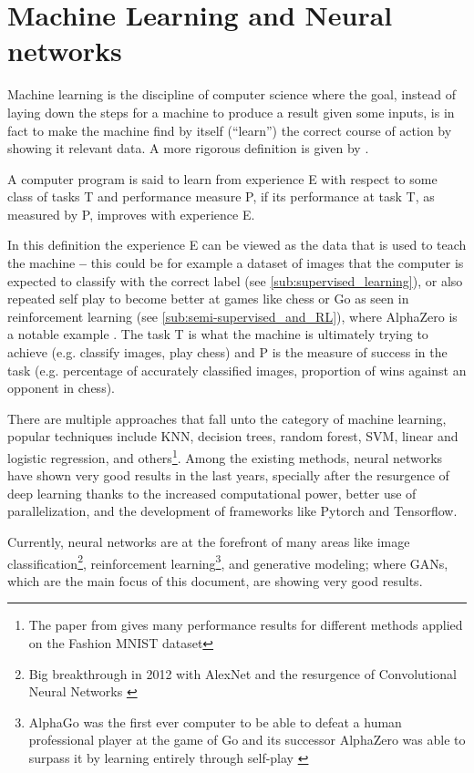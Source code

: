 
\chapter{Machine Learning and Neural networks} \label{cha:neuralNets}

Machine learning is the discipline of computer science where the goal, instead of laying down the steps for a machine to produce a result given some inputs, is in fact to make the machine find by itself (``learn'') the correct course of action by showing it relevant data. A more rigorous definition is given by \textcite{machineLearning1997}.
\begin{citacao}
    A computer program is said to learn from experience E with respect to some class of tasks T and performance measure P, if its performance at task T, as measured by P, improves with experience E. \cite[p. 2]{machineLearning1997}
\end{citacao}

In this definition the experience E can be viewed as the data that is used to teach the machine \textbf{--} this could be for example a dataset of images that the computer is expected to classify with the correct label (see \autoref{sub:supervised_learning}), or also repeated self play to become better at games like chess or Go as seen in reinforcement learning (see \autoref{sub:semi-supervised_and_RL}), where AlphaZero is a notable example \cite{alphaZero2017}.
The task T is what the machine is ultimately trying to achieve (e.g. classify images, play chess) and P is the measure of success in the task (e.g. percentage of accurately classified images, proportion of wins against an opponent in chess).

There are multiple approaches that fall unto the category of machine learning, popular techniques include \gls{KNN}, decision trees, random forest, \gls{SVM}, linear and logistic regression, and others\footnote{
    The paper from \textcite{fashionMNIST2017} gives many performance results for different methods applied on the Fashion MNIST dataset
}. Among the existing methods, neural networks have shown very good results in the last years, specially after the resurgence of deep learning thanks to the increased computational power, better use of parallelization, and the development of frameworks like Pytorch and Tensorflow.

Currently, neural networks are at the forefront of many areas like image classification\footnote{
    Big breakthrough in 2012 with AlexNet and the resurgence of Convolutional Neural Networks \cite{alexnet2012}
}, reinforcement learning\footnote{
    AlphaGo was the first ever computer to be able to defeat a human professional player at the game of Go \cite{alphaGo2016} and its successor AlphaZero was able to surpass it by learning entirely through self-play \cite{alphaZero2017}
}, and generative modeling; where \acp{GAN}, which are the main focus of this document, are showing very good results.

